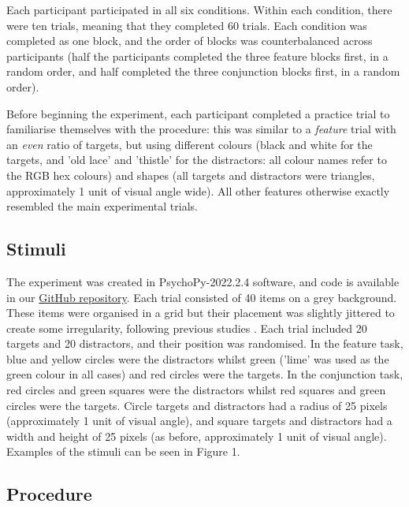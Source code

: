 \documentclass[12pt]{article}
\begin{document}
Each participant participated in all six conditions. Within each condition, there were ten trials, meaning that they completed 60 trials. Each condition was completed as one block, and the order of blocks was counterbalanced across participants (half the participants completed the three feature blocks first, in a random order, and half completed the three conjunction blocks first, in a random order).

Before beginning the experiment, each participant  completed a practice trial to familiarise themselves with the procedure: this was similar to a \textit{feature} trial with an \textit{even} ratio of targets, but using different colours (black and white for the targets, and 'old lace' and 'thistle' for the distractors: all colour names refer to the RGB hex colours) and shapes (all targets and distractors were triangles, approximately 1 unit of visual angle wide). All other features otherwise exactly resembled the main experimental trials.

\subsection{Stimuli}
The experiment was created in PsychoPy-2022.2.4 software, and code is available in our  \href{https://github.com/Riadsala/foraging_scarcity}{GitHub repository}. Each trial consisted of 40 items on a grey background. These items were organised in a grid but their placement was slightly jittered to create some irregularity, following previous studies \citep{kristjansson2014common, clarke2022stable}. Each trial included 20 targets and 20 distractors, and their position was randomised. In the feature task, blue and yellow circles were the distractors whilst green ('lime' was used as the green colour in all cases) and red circles were the targets. In the conjunction task, red circles and green squares were the distractors whilst red squares and green circles were the targets. Circle targets and distractors had a radius of 25 pixels (approximately 1 unit of visual angle), and square targets and distractors had a width and height of 25 pixels (as before, approximately 1 unit of visual angle). Examples of the stimuli can be seen in Figure 1.

\subsection{Procedure}
\end{document}
